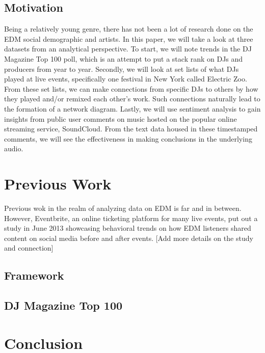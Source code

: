 \documentclass[12pt]{dalcsthesis}
\begin{document}
\section{Motivation}

Being a relatively young genre, there has not been a lot of research done on the EDM social demographic and artists. In this paper, we will take a look at three datasets from an analytical perspective. To start, we will note trends in the DJ Magazine Top 100 poll, which is an attempt to put a stack rank on DJs and producers from year to year. Secondly, we will look at set lists of what DJs played at live events, specifically one festival in New York called Electric Zoo. From these set lists, we can make connections from specific DJs to others by how they played and/or remixed each other's work. Such connections naturally lead to the formation of a network diagram. Lastly, we will use sentiment analysis to gain insights from public user comments on music hosted on the popular online streaming service, SoundCloud. From the text data housed in these timestamped comments, we will see the effectiveness in making conclusions in the underlying audio.

\chapter{Previous Work}

Previous wok in the realm of analyzing data on EDM is far and in between. However, Eventbrite, an online ticketing platform for many live events, put out a study in June 2013 showcasing behavioral trends on how EDM listeners shared content on social media before and after events. [Add more details on the study and connection]

\section{Framework}

\section{DJ Magazine Top 100}

\chapter{Conclusion}



\end{document}
